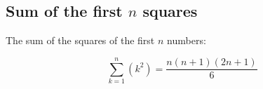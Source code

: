 \subsection{Sum of the first $n$ squares}

The sum of the squares of the first $n$ numbers:

\[
\sum_{k = 1}^{n} (k^2) = \frac{n(n+1)(2n+1)}{6}
\]